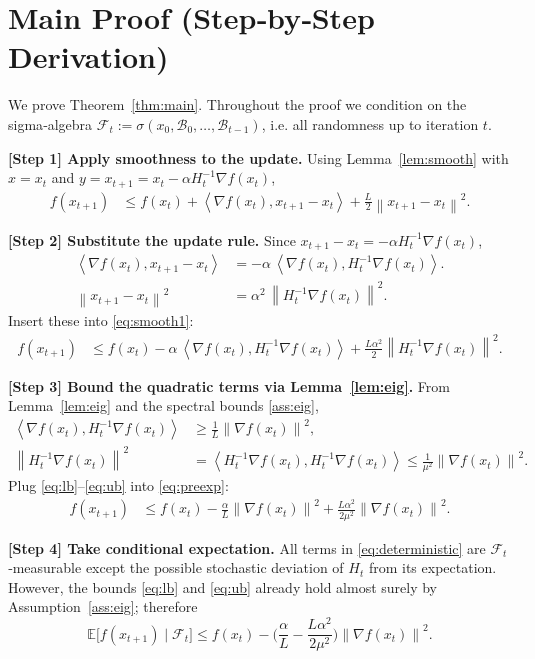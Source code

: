 \documentclass{article}
\newcommand{\E}{\mathbb{E}}
\newcommand{\norm}[1]{\left\|#1\right\|}
\newcommand{\ip}[2]{\left\langle #1,#2\right\rangle}
\begin{document}
\section*{Main Proof (Step‑by‑Step Derivation)}
We prove Theorem~\ref{thm:main}. Throughout the proof we condition on the sigma‑algebra 
$\mathcal{F}_t:=\sigma(x_0,\mathcal{B}_0,\dots,\mathcal{B}_{t-1})$, i.e. all randomness up to iteration $t$.

\noindent\textbf{[Step 1] Apply smoothness to the update.}  
Using Lemma~\ref{lem:smooth} with $x=x_t$ and $y=x_{t+1}=x_t-\alpha H_t^{-1}\nabla f(x_t)$,
\begin{align}
f(x_{t+1})
&\le f(x_t)+\ip{\nabla f(x_t)}{x_{t+1}-x_t}
   +\frac{L}{2}\norm{x_{t+1}-x_t}^2 . \label{eq:smooth1}
\end{align}

\noindent\textbf{[Step 2] Substitute the update rule.}  
Since $x_{t+1}-x_t=-\alpha H_t^{-1}\nabla f(x_t)$,
\begin{align}
\ip{\nabla f(x_t)}{x_{t+1}-x_t}
&=-\alpha\,\ip{\nabla f(x_t)}{H_t^{-1}\nabla f(x_t)} .
\\
\norm{x_{t+1}-x_t}^2
&=\alpha^2\,\norm{H_t^{-1}\nabla f(x_t)}^2 .
\end{align}
Insert these into \eqref{eq:smooth1}:
\begin{align}
f(x_{t+1})
&\le f(x_t)-\alpha\,\ip{\nabla f(x_t)}{H_t^{-1}\nabla f(x_t)}
   +\frac{L\alpha^2}{2}\norm{H_t^{-1}\nabla f(x_t)}^2 .
\label{eq:preexp}
\end{align}

\noindent\textbf{[Step 3] Bound the quadratic terms via Lemma~\ref{lem:eig}.}  
From Lemma~\ref{lem:eig} and the spectral bounds \ref{ass:eig},
\begin{align}
\ip{\nabla f(x_t)}{H_t^{-1}\nabla f(x_t)}
&\ge \frac{1}{L}\norm{\nabla f(x_t)}^2 , \label{eq:lb}\\
\norm{H_t^{-1}\nabla f(x_t)}^2
&= \ip{H_t^{-1}\nabla f(x_t)}{H_t^{-1}\nabla f(x_t)}
  \le \frac{1}{\mu^2}\norm{\nabla f(x_t)}^2 . \label{eq:ub}
\end{align}
Plug \eqref{eq:lb}–\eqref{eq:ub} into \eqref{eq:preexp}:
\begin{align}
f(x_{t+1})
&\le f(x_t)-\frac{\alpha}{L}\norm{\nabla f(x_t)}^2
   +\frac{L\alpha^2}{2\mu^2}\norm{\nabla f(x_t)}^2 .
\label{eq:deterministic}
\end{align}

\noindent\textbf{[Step 4] Take conditional expectation.}  
All terms in \eqref{eq:deterministic} are $\mathcal{F}_t$‑measurable except the
possible stochastic deviation of $H_t$ from its expectation. However,
the bounds \eqref{eq:lb} and \eqref{eq:ub} already hold almost surely by
Assumption~\ref{ass:eig}; therefore
\[
\E\big[f(x_{t+1})\mid\mathcal{F}_t\big]
\le f(x_t)-\Big(\frac{\alpha}{L}
            -\frac{L\alpha^2}{2\mu^2}\Big)\norm{\nabla f(x_t)}^2 .
\tag{2}
\]
\end{document}
